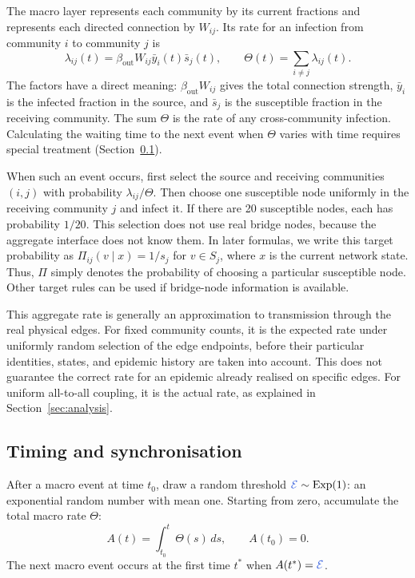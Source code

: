 \documentclass{ieeeaccess}
\newcommand{\michael}[2]{{\color{RoyalBlue}#1}}
\newcommand{\ibar}{\bar{y}}
\newcommand{\sbar}{\bar{s}}
\newcommand{\Exp}{\mathrm{Exp}}
\begin{document}
The macro layer represents each community by its current fractions and represents each directed connection by $W_{ij}$. Its rate for an infection from community $i$ to community $j$ is
\begin{equation}
\label{eq:macro_rate}
\lambda_{ij}(t)=\beta_{\mathrm{out}}W_{ij}\ibar_i(t)\sbar_j(t),
\qquad
\Theta(t)=\sum_{i\neq j}\lambda_{ij}(t).
\end{equation}
The factors have a direct meaning: $\beta_{\mathrm{out}}W_{ij}$ gives the total connection strength, $\ibar_i$ is the infected fraction in the source, and $\sbar_j$ is the susceptible fraction in the receiving community. The sum $\Theta$ is the rate of any cross-community infection. Calculating the waiting time to the next event when $\Theta$ varies with time requires special treatment (Section~\ref{sec:timing}).

When such an event occurs, first select the source and receiving communities $(i,j)$ with probability $\lambda_{ij}/\Theta$. Then choose one susceptible node uniformly in the receiving community $j$ and infect it. If there are 20 susceptible nodes, each has probability $1/20$. This selection does not use real bridge nodes, because the aggregate interface does not know them. In later formulas, we write this target probability as $\Pi_{ij}(v\mid x)=1/s_j$ for $v\in S_j$, where $x$ is the current network state. Thus, $\Pi$ simply denotes the probability of choosing a particular susceptible node. Other target rules can be used if bridge-node information is available.

This aggregate rate is generally an approximation to transmission through the real physical edges. For fixed community counts, it is the expected rate under uniformly random selection of the edge endpoints, before their particular identities, states, and epidemic history are taken into account. This does not guarantee the correct rate for an epidemic already realised on specific edges. For uniform all-to-all coupling, it is the actual rate, as explained in Section~\ref{sec:analysis}.

\subsection{Timing and synchronisation}
\label{sec:timing}

After a macro event at time $t_0$, draw a random threshold $\michael{\mathcal E}{E}\sim\Exp(1)$: an exponential random number with mean one. Starting from zero, accumulate the total macro rate $\Theta$:
\begin{equation}
\label{eq:hazard_integral}
A(t)=\int_{t_0}^{t}\Theta(s)\,ds,
\qquad A(t_0)=0.
\end{equation}
The next macro event occurs at the first time $t^\ast$ when $A(t^\ast)=\michael{\mathcal E}{E}$.
\end{document}

